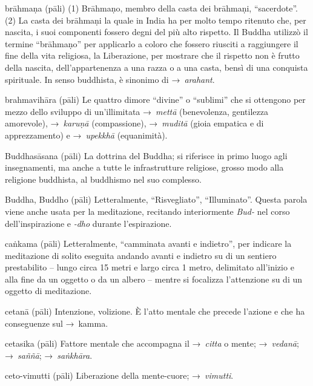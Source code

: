 \begin{glossarydescription}
\item[brāhmaṇa] (pāli)\label{glossary-brahmana} (1) Brāhmaṇo, membro della casta dei brāhmaṇi,
  ``sacerdote''. (2) La casta dei brāhmaṇi la quale in India ha per molto tempo
  ritenuto che, per nascita, i suoi componenti fossero degni del più alto
  rispetto. Il Buddha utilizzò il termine ``brāhmaṇo'' per applicarlo a coloro
  che fossero riusciti a raggiungere il fine della vita religiosa, la
  Liberazione, per mostrare che il rispetto non è frutto della nascita,
  dell'appartenenza a una razza o a una casta, bensì di una conquista
  spirituale. In senso buddhista, è sinonimo di →~\emph{arahant}.

\item[brahmavihāra] (pāli) Le quattro dimore ``divine'' o ``sublimi'' che si
  ottengono per mezzo dello sviluppo di un'illimitata →~\emph{mettā}
  (benevolenza, gentilezza amorevole), →~\emph{karuṇā} (compassione),
  →~\emph{muditā} (gioia empatica e di apprezzamento) e →~\emph{upekkhā}
  (equanimità).

\item[Buddhasāsana] (pāli) La dottrina del Buddha; si riferisce in primo luogo
  agli insegnamenti, ma anche a tutte le infrastrutture religiose, grosso modo
  alla religione buddhista, al buddhismo nel suo complesso.

\item[Buddha, Buddho] (pāli) Letteralmente, ``Risvegliato'', ``Illuminato''.
  Questa parola viene anche usata per la meditazione, recitando interiormente
  \emph{Bud-} nel corso dell'inspirazione e \emph{-dho} durante l'espirazione.


\item[caṅkama] (pāli) Letteralmente, ``camminata avanti e indietro'', per
  indicare la meditazione di solito eseguita andando avanti e indietro su di un
  sentiero prestabilito -- lungo circa 15 metri e largo circa 1 metro,
  delimitato all'inizio e alla fine da un oggetto o da un albero -- mentre si
  focalizza l'attenzione su di un oggetto di meditazione.

\item[cetanā] (pāli) Intenzione, volizione. È l'atto mentale che precede
  l'azione e che ha conseguenze sul →~kamma.

\item[cetasika] (pāli) Fattore mentale che accompagna il →~\emph{citta} o mente;
  →~\emph{vedanā}; →~\emph{saññā}; →~\emph{saṅkhāra}.

\item[ceto-vimutti] (pāli) Liberazione della mente-cuore; →~\emph{vimutti}.


\end{glossarydescription}
